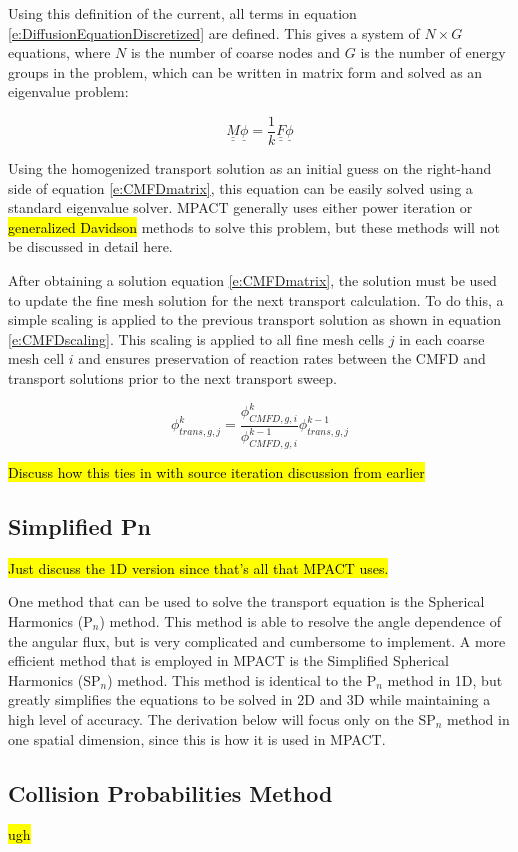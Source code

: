 Using this definition of the current, all terms in equation \ref{e:DiffusionEquationDiscretized} are defined.  This gives a system of $N\times G$ equations, where $N$ is the number of coarse nodes and $G$ is the number of energy groups in the problem, which can be written in matrix form and solved as an eigenvalue problem:

\begin{equation}\label{e:CMFDmatrix}
\underline{\underline{M}}\underline{\phi}=\frac{1}{k}\underline{\underline{F}}\underline{\phi}
\end{equation}

Using the homogenized transport solution as an initial guess on the right-hand side of equation \ref{e:CMFDmatrix}, this equation can be easily solved using a standard eigenvalue solver.  MPACT generally uses either power iteration or \hl{generalized Davidson} methods to solve this problem, but these methods will not be discussed in detail here.

After obtaining a solution equation \ref{e:CMFDmatrix}, the solution must be used to update the fine mesh solution for the next transport calculation.  To do this, a simple scaling is applied to the previous transport solution as shown in equation \ref{e:CMFDscaling}.  This scaling is applied to all fine mesh cells $j$ in each coarse mesh cell $i$ and ensures preservation of reaction rates between the CMFD and transport solutions prior to the next transport sweep.

\begin{equation}\label{e:CMFDscaling}
\phi_{trans,g,j}^{k}=\frac{\phi_{CMFD,g,i}^k}{\phi_{CMFD,g,i}^{k-1}}\phi_{trans,g,j}^{k-1}
\end{equation}

\hl{Discuss how this ties in with source iteration discussion from earlier}

\subsection{Simplified Pn}

\hl{Just discuss the 1D version since that's all that MPACT uses.}

One method that can be used to solve the transport equation is the Spherical Harmonics (P$_n$) method.  This method is able to resolve the angle dependence of the angular flux, but is very complicated and cumbersome to implement.  A more efficient method that is employed in MPACT is the Simplified Spherical Harmonics (SP$_n$) method.  This method is identical to the P$_n$ method in 1D, but greatly simplifies the equations to be solved in 2D and 3D while maintaining a high level of accuracy.  The derivation below will focus only on the SP$_n$ method in one spatial dimension, since this is how it is used in MPACT.

\subsection{Collision Probabilities Method}

\hl{ugh}